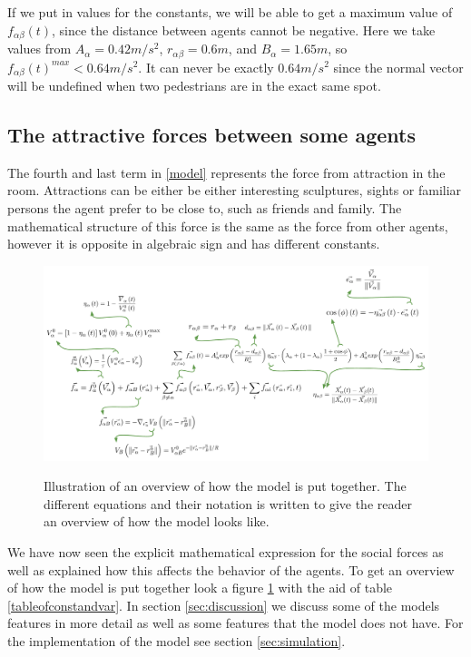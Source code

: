 If we put in values for the constants, we will be able to get a maximum value of $ f_{\alpha\beta}(t) $, 
since the distance between agents cannot be negative. Here we take values from \cite{ABconstant} $ A_{\alpha} = 0.42 m/s^{2} $, 
$ r_{\alpha\beta} = 0.6 m $, and $ B_{\alpha} = 1.65 m $, so 
$ f_{\alpha\beta}(t)^{max} < 0.64 m/s^{2} $. It can never be exactly $0.64m/s^2$ since the normal 
vector will be undefined when two pedestrians are in the exact same spot.


\subsection{The attractive forces between some agents}
The fourth and last term in \eqref{model} represents the force from attraction 
in the room. Attractions can be either be either interesting sculptures, 
sights or familiar persons the agent prefer to be close to, such as friends 
and family. The mathematical structure of this force is the same as the force 
from other agents, however it is opposite in algebraic sign and has different 
constants. 

\begin{figure}[hb] %
    \centering
    {\includegraphics[scale=0.35]{Figures/overview.pdf}} 
    \caption[Overview of the model]{Illustration of an overview of how the model is put together. The different equations and their notation is written to give the 
	     reader an overview of how the model looks like.}
    \label{overview}
\end{figure}

We have now seen the explicit mathematical expression for the social forces 
as well as explained how this affects the behavior of the agents. To get an 
overview of how the model is put together look a figure \ref{overview} with 
the aid of table \ref{tableofconstandvar}. In section \ref{sec:discussion} 
we discuss some of the models features in more detail as well as some features 
that the model does not have. For the implementation of the model see section \ref{sec:simulation}.

